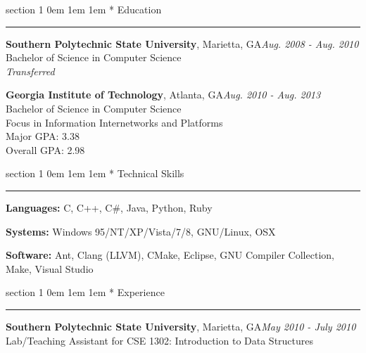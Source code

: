 \documentclass{article}
\makeatletter
\newcommand{\name}[1]{\def \@name {#1}}
\newcommand{\streetaddress}[1]{\def \@streetaddress {#1}}
\newcommand{\citystatezip}[1]{\def \@citystatezip {#1}}
\newcommand{\phone}[1]{\def \@phone {#1}}
\newcommand{\email}[1]{\def \@email {#1}}
\newcommand{\website}[1]{\def \@website {#1}}
\renewcommand{\section}[1]{
	\vspace{0.75em} %
	\@startsection
		{section}
		{1}
		{\z@}
		{0em}
		{1em \@minus 1em} %
		{\normalfont\large\sc\bfseries}
		*
		{#1}
	\vspace{-0.75em} %
	\hrule
	\vspace{0.25em} %
	\par
}
\newcommand{\entry}[1]{\def \@entry {#1}}
\newcommand{\dates}[1]{\def \@dates {#1}}
\newcommand{\location}[1]{\def \@location {#1}}
\newenvironment{locationentry}{
		\vspace{0.5em} %
		{\bf \@entry}, \@location \hfill {\it \@dates} \\
	}{}
\makeatother
\begin{document}
\name{Robert Kernan}
\phone{(770) 355-4050}
\streetaddress{16 Arbor Way Drive}
\citystatezip{Decatur, GA 30030}
\email{rkernan@gmail.com}
\website{robertkernan.com}

\maketitle

\thispagestyle{empty}

%
%

\section{Education}

\entry{Southern Polytechnic State University}
\location{Marietta, GA}
\dates{Aug. 2008 - Aug. 2010}
\begin{locationentry}
Bachelor of Science in Computer Science \\
\it{Transferred}
\par
\end{locationentry}

\entry{Georgia Institute of Technology}
\location{Atlanta, GA}
\dates{Aug. 2010 - Aug. 2013}
\begin{locationentry}
Bachelor of Science in Computer Science \\
Focus in Information Internetworks and Platforms \\
Major GPA: 3.38 \\
Overall GPA: 2.98
\par
\end{locationentry}

\section{Technical Skills}
\vspace{0.5em}
{\bf Languages:}
C, C++, C\#, Java, Python, Ruby

\vspace{0.25em}
{\bf Systems:}
Windows 95/NT/XP/Vista/7/8, GNU/Linux, OSX

\vspace{0.25em}
{\bf Software:}
Ant, Clang (LLVM), CMake, Eclipse, GNU Compiler Collection, Make, Visual Studio

\section{Experience}
\entry{Southern Polytechnic State University}
\location{Marietta, GA}
\dates{May 2010 - July 2010}
\begin{locationentry}
 Lab/Teaching Assistant for CSE 1302: Introduction to Data Structures
\end{locationentry}
\end{document}
